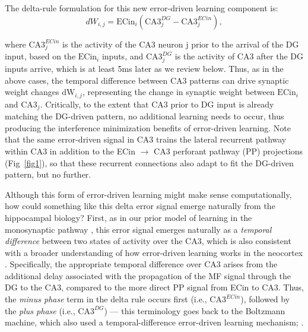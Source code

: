 \documentclass[10pt,letterpaper]{article}
\begin{document}
The delta-rule formulation for this new error-driven learning component is:
\begin{equation}
\label{eq.CA3EDL}
    dW_{i,j} = \mbox{ECin}_i (\mbox{CA3}_j^{DG} - \mbox{CA3}_j^{ECin} ) ,
\end{equation}

where $\mbox{CA3}_j^{ECin}$ is the activity of the CA3 neuron $\mbox{j}$ prior to the arrival of the DG input, based on the $\mbox{ECin}_i$ inputs, and $\mbox{CA3}_j^{DG}$ is the activity of CA3 after the DG inputs arrive, which is at least 5ms later as we review below. Thus, as in the above cases, the temporal difference between CA3 patterns can drive synaptic weight changes $\mbox{dW}_{i,j}$, representing the change in synaptic weight between $\mbox{ECin}_i$ and $\mbox{CA3}_j$.  Critically, to the extent that CA3 prior to DG input is already matching the DG-driven pattern, no additional learning needs to occur, thus producing the interference minimization benefits of error-driven learning.  Note that the same error-driven signal in CA3 trains the lateral recurrent pathway within CA3 in addition to the ECin $\rightarrow$ CA3 perforant pathway (PP) projections (Fig~\ref{fig1}), so that these recurrent connections also adapt to fit the DG-driven pattern, but no further.

Although this form of error-driven learning might make sense computationally, how could something like this delta error signal emerge naturally from the hippocampal biology?  First, as in our prior model of learning in the monosynaptic pathway \cite{KetzMorkondaOReilly13}, this error signal emerges naturally as a \emph{temporal difference} between two states of activity over the CA3, which is also consistent with a broader understanding of how error-driven learning works in the neocortex \cite{OReilly96,OReillyMunakata00,OReillyRussinZolfagharEtAl21}. Specifically, the appropriate temporal difference over CA3 arises from the additional delay associated with the propagation of the MF signal through the DG to the CA3, compared to the more direct PP signal from ECin to CA3.  Thus, the \emph{minus phase} term in the delta rule occurs first (i.e., $\mbox{CA3}^{ECin}$), followed by the \emph{plus phase} (i.e., $\mbox{CA3}^{DG}$) --- this terminology goes back to the Boltzmann machine, which also used a temporal-difference error-driven learning mechanism; \cite{AckleyHintonSejnowski85}.
\end{document}
